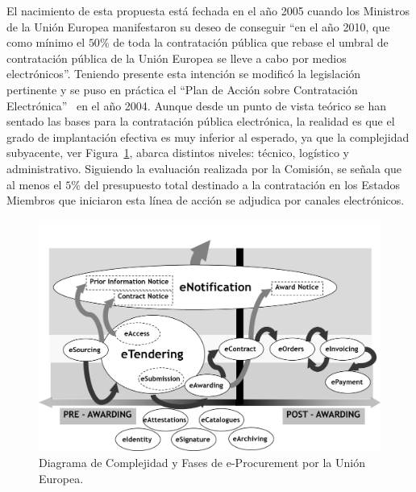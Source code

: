 El nacimiento de esta propuesta está fechada en el año 2005 cuando los Ministros de la Unión Europea manifestaron su deseo de conseguir ``en el año 2010,
que como mínimo el $50$\%  de toda la contratación pública que rebase el umbral de contratación pública de la Unión \gls{Europea} se lleve a cabo
por medios electrónicos''. Teniendo presente esta intención se modificó la legislación pertinente y se puso en práctica el ``Plan 
de Acción sobre Contratación Electrónica''~\cite{plan2004} en el año 2004. Aunque desde un punto de vista teórico se han sentado las bases para la contratación
pública electrónica, la realidad es que el grado de implantación efectiva es muy inferior al esperado, ya que la complejidad subyacente,
ver Figura~\ref{fig:e-proc-complexity}, abarca distintos niveles: técnico, logístico y administrativo. Siguiendo la evaluación realizada por la Comisión, se señala que al
menos el $5\%$ del presupuesto total destinado a la contratación en los \gls{Estados} Miembros que iniciaron esta línea de acción se adjudica
por canales electrónicos.

\begin{figure}[!htb]
\centering
	\includegraphics[width=16cm]{images/phd/eproc/e-proc-complexity}
\caption{Diagrama de Complejidad y Fases de e-Procurement por la Unión Europea.}
\label{fig:e-proc-complexity}
\end{figure}

